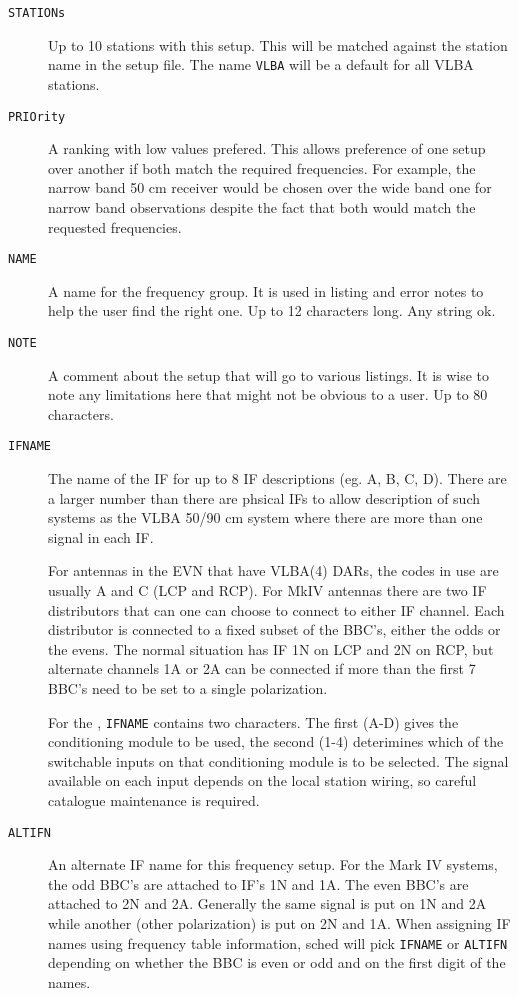 \documentclass{report}
\begin{document}
\begin{description}

\item [{\tt STATIONs}] Up to 10 stations with this setup.  This will
be matched against the station name in the setup file.  The name
{\tt VLBA} will be a default for all VLBA stations.

\item [{\tt PRIOrity}] A ranking with low values prefered.  This
allows preference of one setup over another if both match the
required frequencies.  For example, the narrow band 50 cm receiver
would be chosen over the wide band one for narrow band observations
despite the fact that both would match the requested frequencies.

\item [{\tt NAME}] A name for the frequency group.  It is used
in listing and error notes to help the user find the right one.
Up to 12 characters long.  Any string ok.

\item [{\tt NOTE}]  A comment about the setup that will go to
various listings.  It is wise to note any limitations here that
might not be obvious to a user.  Up to 80 characters.

\item [{\tt IFNAME}\label{FQ:IFNAME}] The name of the IF for up to 8 IF
descriptions (eg. A, B, C, D).  There are a larger number than there are
phsical IFs to allow description of such systems as the VLBA 50/90 cm
system where there are more than one signal in each IF.

For antennas in the EVN that have VLBA(4) DARs, the codes in use are
usually A and C (LCP and RCP). For MkIV antennas there are two IF
distributors that can one can choose to connect to either IF channel.
Each distributor is connected to a fixed subset of the BBC's, either
the odds or the evens.  The normal situation has IF 1N on LCP and 2N
on RCP, but alternate channels 1A or 2A can be connected if more than
the first 7 BBC's need to be set to a single polarization.

For the , {\tt IFNAME} contains two
characters. The first (A-D) gives the conditioning module to be used,
the second (1-4) deterimines which of the switchable inputs on that
conditioning module is to be selected. The signal available on each
input depends on the local station wiring, so careful catalogue
maintenance is required.

\item[{\tt ALTIFN}]  An alternate IF name for this frequency setup.
For the Mark IV systems, the odd BBC's are attached to IF's 1N and
1A.  The even BBC's are attached to 2N and 2A.  Generally the
same signal is put on 1N and 2A while another (other polarization)
is put on 2N and 1A.  When assigning IF names using frequency table
information, sched will pick {\tt IFNAME} or {\tt ALTIFN} depending
on whether the BBC is even or odd and on the first digit of the
names.


\end{description}
\end{document}
